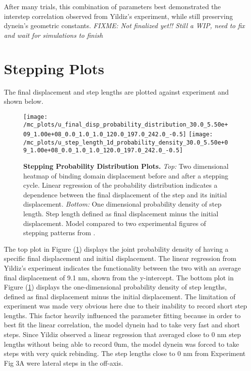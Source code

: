 After many trials, this combination of parameters best demonstrated the interstep correlation observed from Yildiz's experiment, while still preserving dynein's geometric constants. \textit{FIXME: Not finalized yet!! Still a WIP, need to fix and wait for simulations to finish}


\section{Stepping Plots}
The final displacement and step lengths are plotted against experiment and shown below.

\begin{figure}[H]
	\centering
	\texttt{[image: /mc\_plots/u\_final\_disp\_probability\_distribution\_30.0\_5.50e+09\_1.00e+08\_0.0\_1.0\_1.0\_120.0\_197.0\_242.0\_-0.5]}
	\texttt{[image: /mc\_plots/u\_step\_length\_1d\_probability\_density\_30.0\_5.50e+09\_1.00e+08\_0.0\_1.0\_1.0\_120.0\_197.0\_242.0\_-0.5]}
	\caption[Final Displacement Probability Distribution]{\textbf{Stepping Probability Distribution Plots.} \textit{Top:} Two dimensional heatmap of binding domain displacement before and after a stepping cycle. Linear regression of the probability distribution indicates a dependence between the final displacement of the step and its initial displacement. \textit{Bottom:} One dimensional probability density of step length. Step length defined as final displacement minus the initial displacement. Model compared to two experimental figures of stepping patterns from \citep{Dewitt2012}.} 
	\label{fig:DataStep}
\end{figure}
\newpage
The top plot in Figure (\ref{fig:DataStep}) displays the joint probability density of having a specific final displacement and initial displacement. The linear regression from Yildiz's experiment indicates the functionality between the two with an average final displacement of 9.1 nm, shown from the y-intercept. The bottom plot in Figure (\ref{fig:DataStep}) displays the one-dimensional probability density of step lengths, defined as final displacement minus the initial displacement. The limitation of experiment was made very obvious here due to their inability to record short step lengths. This factor heavily influenced the parameter fitting because in order to best fit the linear correlation, the model dynein had to take very fast and short steps. Since Yildiz observed a linear regression that averaged close to 0 nm step lengths without being able to record 0nm, the model dynein was forced to take steps with very quick rebinding. The step lengths close to 0 nm from Experiment Fig 3A were lateral steps in the off-axis. 

